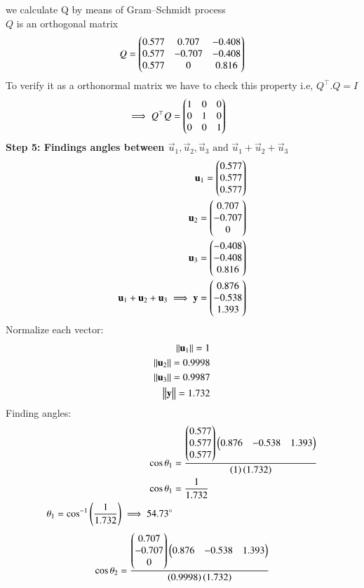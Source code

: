 \begin{enumerate}[label=\thesection.\arabic*,ref=\thesection.\theenumi]
we calculate Q by means of Gram–Schmidt process\\
$Q$ is an orthogonal matrix 
\begin{align*}
    Q=\begin{pmatrix} 0.577&0.707&-0.408\\0.577&-0.707&-0.408\\0.577&0&0.816\end{pmatrix}
\end{align*}
To verify it as a orthonormal matrix we have to check this property i.e,  $Q^{\top}.Q =I$
\begin{align*}
    \implies Q^\top Q &= \begin{pmatrix}1&0&0\\0&1&0\\0&0&1\end{pmatrix}
\end{align*}
\textbf{Step 5: Findings angles between $\vec{u}_1,\vec{u}_2,\vec{u}_3  \text{ and } \vec{u}_1+\vec{u}_2+\vec{u}_3 $}
\begin{align}
    \mathbf{u}_1=\begin{pmatrix}0.577\\0.577\\0.577\end{pmatrix}\\
    \mathbf{u}_2=\begin{pmatrix}0.707 \\ -0.707 \\ 0\end{pmatrix} \\
    \mathbf{u}_3=\begin{pmatrix}-0.408\\-0.408\\0.816\end{pmatrix}\\
    \mathbf{u}_1+\mathbf{u}_2+\mathbf{u}_3\implies\mathbf{y}=\begin{pmatrix}0.876\\-0.538\\1.393\end{pmatrix}
\end{align}
Normalize each vector:\\
   \begin{align}
    \left\Vert\mathbf{u}_1\right\Vert=1\\
    \left\Vert\mathbf{u}_2\right\Vert=0.9998\\
     \left\Vert\mathbf{u}_3\right\Vert=0.9987\\
     \left\Vert\mathbf{y}\right\Vert=1.732
   \end{align}
Finding angles:
\begin{align}
    \cos{\theta_1}&=\frac{\begin{pmatrix}0.577 \\0.577 \\0.577\end{pmatrix}\begin{pmatrix}0.876&-0.538&1.393\end{pmatrix}}{\left(1\right)\left(1.732\right)}\\
    \cos{\theta_1}&=\frac{1}{1.732}\\
    \theta_1=\cos^{-1}\left(\frac{1}{1.732}\right)
    \implies 54.73\degree
\end{align}
\begin{align}
   \cos{\theta_2}&=\frac{\myvec{0.707 \\-0.707 \\0}\myvec{0.876&-0.538&1.393}}{\brak{0.9998}\brak{1.732}}\\

\end{align}
\end{enumerate}
